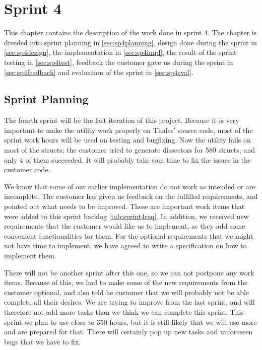 \chapter{Sprint 4}
This chapter contains the description of the work done in sprint 4. The 
chapter is diveded into sprint planning in \autoref{sec:sp4planning}, design 
done during the sprint in \autoref{sec:sp4design}, the implementation in 
\autoref{sec:sp4impl}, the result of the sprint testing in 
\autoref{sec:sp4test}, feedback the customer gave us during the sprint in 
\autoref{sec:sp4feedback} and evaluation of the sprint in 
\autoref{sec:sp4eval}.

\section{Sprint Planning}
\label{sec:sp4planning}
The fourth sprint will be the last iteration of this project. Because it is very important to make the \gls{utility} work properly on Thales' source code, most of the sprint work hours will be used on testing and bugfixing. Now the \gls{utility} fails on most of the \glspl{struct}; the customer tried to generate \glspl{dissector} for 580 \glspl{struct}, and only 4 of them succeeded. It will probably take som time to fix the issues in the customer code.

We know that some of our earlier implementation do not work as intended or are incomplete. The customer has given us feedback on the fulfilled requirements, and pointed out what needs to be improved. These are important work items that were added to this sprint backlog \ref{tab:sprint4req}. In addition, we received new requirements that the customer would like us to implement, as they add some convenient functionalities for them. For the optional requirements that we might not have time to implement, we have agreed to write a specification on how to implement them. 

There will not be another sprint after this one, so we can not postpone any work items. Because of this, we had to make some of the new requirements from the customer optional, and also told he customer that we will probably not be able complete all their desires. We are trying to improve from the last sprint, and will therefore not add more tasks than we think we can complete this sprint. This sprint we plan to use close to 350 hours, but it is still likely that we will use more and are prepared for that. There will certainly pop up new tasks and unforeseen bugs that we have to fix.

